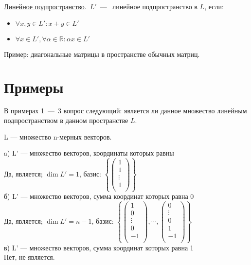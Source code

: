 \begin{definition}
	\underline{Линейное подпространство}.~$L'$~---~ линейное подпространство в $L$, если:
	\begin{itemize}
		\item $\forall x, y \in L': x + y \in L'$ %
		\item $\forall x \in L', \forall \alpha \in \mathbb{R} : \alpha x \in L'$
	\end{itemize}
\end{definition}

Пример: диагональные матрицы в пространстве обычных матриц.
\section{Примеры}
В примерах 1~---~3 вопрос следующий: является ли данное множество линейным подпространством в данном пространстве $L$.
\begin{prim} %
	L --- множество n-мерных векторов. %
\end{prim}
a) L' --- множество векторов, координаты которых равны\\
Да, является;  $\dim L'=1$, базис: %
$\left\{
\begin{pmatrix} %
1\\ 
1\\ 
\vdots\\
1\\ 
\end{pmatrix}
\right\}$\\
б) L' --- множество векторов,  сумма координат которых равна 0\\
Да, является;  $\dim  L'=n-1$, базис: 
$
\left\{ %
\begin{pmatrix} %
1\\ 
0\\ 
\vdots\\ 
0\\ 
-1\\
\end{pmatrix}
, \cdots ,
\begin{pmatrix}
0\\ 
\vdots\\ 
0\\ 
1\\ 
-1\\
\end{pmatrix}
\right\}$\\
в) L' --- множество векторов,  сумма координат которых равна 1\\
Нет, не является.\\

